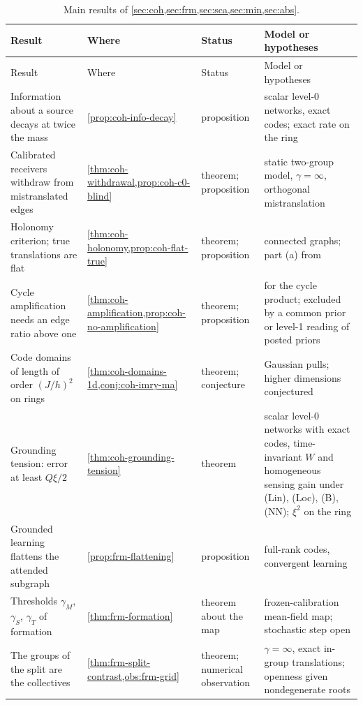 \begingroup
\small
\setlength{\tabcolsep}{3pt}
\begin{longtable}{@{}>{\raggedright\arraybackslash}p{}>{\raggedright\arraybackslash}p{}>{\raggedright\arraybackslash}p{}>{\raggedright\arraybackslash}p{}@{}}
\caption{Main results of \cref{sec:coh,sec:frm,sec:sca,sec:min,sec:abs}.}\label{tab:int-results-b}\\
\toprule
Result & Where & Status & Model or hypotheses\\
\midrule
\endfirsthead
\toprule
Result & Where & Status & Model or hypotheses\\
\midrule
\endhead
\bottomrule
\endfoot
Information about a source decays at twice the mass & \cref{prop:coh-info-decay} & proposition & scalar level-0 networks, exact codes; exact rate on the ring\\
Calibrated receivers withdraw from mistranslated edges & \cref{thm:coh-withdrawal,prop:coh-c0-blind} & theorem; proposition & static two-group model, $\gamma=\infty$, orthogonal mistranslation\\
Holonomy criterion; true translations are flat & \cref{thm:coh-holonomy,prop:coh-flat-true} & theorem; proposition & connected graphs; part (a) from \citet{dennis2026magent}\\
Cycle amplification needs an edge ratio above one & \cref{thm:coh-amplification,prop:coh-no-amplification} & theorem; proposition & for the cycle product; excluded by a common prior or level-1 reading of posted priors\\
Code domains of length of order $(J/h)^2$ on rings & \cref{thm:coh-domains-1d,conj:coh-imry-ma} & theorem; conjecture & Gaussian pulls; higher dimensions conjectured\\
Grounding tension: error at least $Q\xi/2$ & \cref{thm:coh-grounding-tension} & theorem & scalar level-0 networks with exact codes, time-invariant $W$ and homogeneous sensing gain under (Lin), (Loc), (B), (NN); $\xi^2$ on the ring\\
\addlinespace[2pt]
Grounded learning flattens the attended subgraph & \cref{prop:frm-flattening} & proposition & full-rank codes, convergent learning\\
Thresholds $\gamma_M$, $\gamma_S$, $\gamma_T$ of formation & \cref{thm:frm-formation} & theorem about the map & frozen-calibration mean-field map; stochastic step open\\
The groups of the split are the collectives & \cref{thm:frm-split-contrast,obs:frm-grid} & theorem; numerical observation & $\gamma=\infty$, exact in-group translations; openness given nondegenerate roots\\

\end{longtable}
